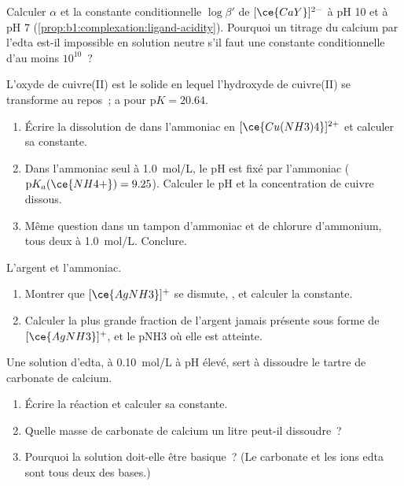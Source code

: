\begin{exercise}[$\star\star$]\label{exo:b1:complexation:9}
Calculer $\alpha$ et la constante conditionnelle $\log\beta'$ de
$[\ce{CaY}]^{2-}$ à pH 10 et à pH 7
(\cref{prop:b1:complexation:ligand-acidity}). Pourquoi un titrage du
calcium par l'edta est-il impossible en solution neutre s'il faut une
constante conditionnelle d'au moins $10^{10}$~?
\end{exercise}

\begin{exercise}[$\star\star\star$]\label{exo:b1:complexation:10}
L'oxyde de cuivre(II)  est le solide en lequel l'hydroxyde de
cuivre(II) se transforme au repos~;  a
pour $\mathrm{p}K = 20.64$.
\begin{enumerate}
  \item Écrire la dissolution de  dans l'ammoniac en
        $[\ce{Cu(NH3)4}]^{2+}$ et calculer sa constante.
  \item Dans l'ammoniac seul à \qty{1.0}{mol/L}, le pH est fixé par
        l'ammoniac ($\mathrm{p}K_a(\ce{NH4+}) = 9.25$). Calculer le pH et
        la concentration de cuivre dissous.
  \item Même question dans un tampon d'ammoniac et de chlorure
        d'ammonium, tous deux à \qty{1.0}{mol/L}. Conclure.
\end{enumerate}
\end{exercise}

\begin{exercise}[$\star\star\star$]\label{exo:b1:complexation:11}
L'argent et l'ammoniac.
\begin{enumerate}
  \item Montrer que $[\ce{AgNH3}]^{+}$ se dismute,
        , et calculer la constante.
  \item Calculer la plus grande fraction de l'argent jamais présente sous
        forme de $[\ce{AgNH3}]^{+}$, et le pNH3 où elle est atteinte.
\end{enumerate}
\end{exercise}

\begin{exercise}[$\star\star\star$]\label{exo:b1:complexation:12}
Une solution d'edta,  à \qty{0.10}{mol/L} à pH élevé, sert à
dissoudre le tartre de carbonate de calcium.
\begin{enumerate}
  \item Écrire la réaction et calculer sa constante.
  \item Quelle masse de carbonate de calcium un litre peut-il dissoudre~?
  \item Pourquoi la solution doit-elle être basique~? (Le carbonate et
        les ions edta sont tous deux des bases.)
\end{enumerate}
\end{exercise}

